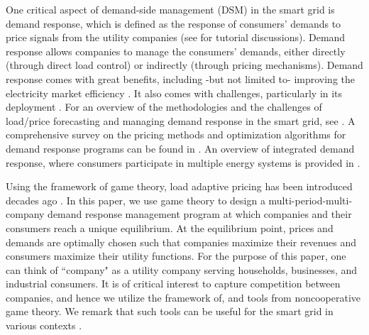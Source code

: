 
{\color{black}
One critical aspect of demand-side management (DSM) in the smart grid is demand response, which is defined as the response of consumers' demands to price signals from the utility companies (see \cite{DR,DSM,DSview} for tutorial discussions). Demand response allows companies to manage the consumers' demands, either directly (through direct load control) or indirectly (through pricing mechanisms). Demand response comes with great benefits, including -but not limited to- improving the electricity market efficiency \cite{DReff}. It also comes with challenges, particularly in its deployment \cite{challengesDR}. For an overview of the methodologies and the challenges of load/price forecasting and managing demand response in the smart grid, see \cite{DRprice}. A comprehensive survey on the pricing methods and optimization algorithms for demand response programs can be found in \cite{surveyDRM}. An overview of integrated demand response, where consumers participate in multiple energy systems is provided in \cite{reviewAE}.



 Using the framework of game theory, load adaptive pricing has been introduced decades ago  \cite{loadadapt}. {\color{blue}In this paper, we use game theory to design a multi-period-multi-company demand response management program at which companies and their consumers reach a unique equilibrium. At the equilibrium point, prices and demands are optimally chosen such that companies maximize their  revenues and consumers maximize their utility functions.} {\color{black} For the purpose of this paper, one can think of ``company" as a utility company serving households, businesses, and industrial consumers.} It is of critical interest to capture competition between companies, and hence we utilize the framework of, and tools from noncooperative game theory. We remark that such tools can be useful for the smart grid in various contexts \cite{survey}. 


}
